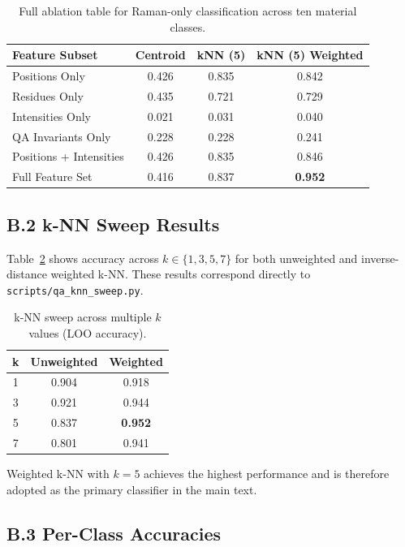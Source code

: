 \documentclass[12pt]{article}
\begin{document}
\begin{table}[h!]
\centering
\caption{Full ablation table for Raman-only classification across ten material classes.}
\label{tab:ablationB}
\begin{tabular}{lccc}
\hline
\textbf{Feature Subset}
& \textbf{Centroid} 
& \textbf{kNN (5)} 
& \textbf{kNN (5) Weighted} \\
\hline
Positions Only 
& 0.426 
& 0.835 
& 0.842 \\
Residues Only 
& 0.435 
& 0.721 
& 0.729 \\
Intensities Only 
& 0.021 
& 0.031 
& 0.040 \\
QA Invariants Only 
& 0.228 
& 0.228 
& 0.241 \\
Positions + Intensities 
& 0.426 
& 0.835 
& 0.846 \\
Full Feature Set 
& 0.416 
& 0.837 
& \textbf{0.952} \\
\hline
\end{tabular}
\end{table}

\subsection*{B.2 k-NN Sweep Results}

Table~\ref{tab:knnsweep} shows accuracy across $k \in \{1,3,5,7\}$ for both unweighted and inverse-distance weighted
k-NN. These results correspond directly to {\tt scripts/qa\_knn\_sweep.py}.

\begin{table}[h!]
\centering
\caption{k-NN sweep across multiple $k$ values (LOO accuracy).}
\label{tab:knnsweep}
\begin{tabular}{ccc}
\hline
\textbf{k} 
& \textbf{Unweighted} 
& \textbf{Weighted} \\
\hline
1 & 0.904 & 0.918 \\
3 & 0.921 & 0.944 \\
5 & 0.837 & \textbf{0.952} \\
7 & 0.801 & 0.941 \\
\hline
\end{tabular}
\end{table}

Weighted k-NN with $k=5$ achieves the highest performance and is therefore adopted as the primary classifier
in the main text.

\subsection*{B.3 Per-Class Accuracies}
\end{document}
